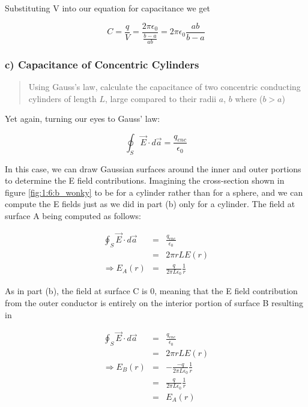 Substituting V into our equation for capacitance we get

\begin{equation}
  C = \frac q V
  = \frac{2 \pi \epsilon_0}{\frac{b - a}{ab}}
  = 2 \pi \epsilon_0 \frac{ab}{b - a}
\end{equation}

\subsubsection*{c) Capacitance of Concentric Cylinders}


\begin{quote}
  Using Gauss's law, calculate the capacitance of two concentric
  conducting cylinders of length $L$, large compared to their radii
  $a$, $b$ where ($b > a$)
\end{quote}

Yet again, turning our eyes to Gauss' law:

\begin{equation}
  \oint_S \vec{E} \cdot d\vec{a} = \frac{q_{enc}}{\epsilon_0}
\end{equation}

In this case, we can draw Gaussian surfaces around the inner and outer
portions to determine the E field contributions.  Imagining the
cross-section shown in figure \ref{fig:1:6:b_wonky} to be for a
cylinder rather than for a sphere, and we can compute the E fields
just as we did in part (b) only for a cylinder.  The field at surface
A being computed as follows:

\begin{equation}
  \begin{array}{lcl}
    \oint_S \vec{E} \cdot d\vec{a}
    &=&\frac{q_{enc}}{\epsilon_0} \\
    &=& 2 \pi r L E(r) \\
    \Rightarrow E_{A}(r) &=& \frac{q}{2 \pi L \epsilon_0} \frac 1 r
  \end{array}
\end{equation}

As in part (b), the field at surface C is 0, meaning that the E field
contribution from the outer conductor is entirely on the interior
portion of surface B resulting in

\begin{equation}
  \begin{array}{lcl}
    \oint_S \vec{E} \cdot d\vec{a}
    &=&\frac{q_{enc}}{\epsilon_0} \\
    &=& 2 \pi r L E(r)\\
    \Rightarrow E_{B}(r) &=& -\frac{-q}{2 \pi L \epsilon_0} \frac 1 r\\
     &=& \frac{q}{2 \pi L \epsilon_0} \frac 1 r\\
     &=& E_{A}(r)
  \end{array}
\end{equation}

